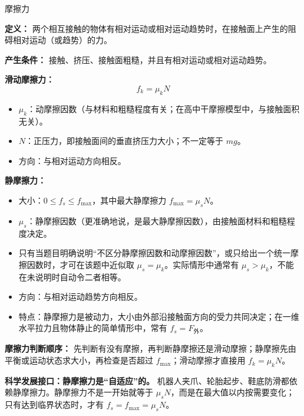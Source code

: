 \begin{conceptbox}{摩擦力}

\textbf{定义：} 两个相互接触的物体有相对运动或相对运动趋势时，在接触面上产生的阻碍相对运动（或趋势）的力。

\textbf{产生条件：} 接触、挤压、接触面粗糙，并且有相对运动或相对运动趋势。

\vspace{0.5em}
\textbf{滑动摩擦力：}
\[
f_k = \mu_k N
\]
\begin{itemize}
  \item $\mu_k$：动摩擦因数（与材料和粗糙程度有关；在高中干摩擦模型中，与接触面积无关）。
  \item $N$：正压力，即接触面间的垂直挤压力大小；不一定等于 $mg$。
  \item 方向：与相对运动方向相反。
\end{itemize}

\textbf{静摩擦力：}
\begin{itemize}
  \item 大小：$0 \leq f_s \leq f_{\max}$，其中最大静摩擦力 $f_{\max} = \mu_s N$。
  \item $\mu_s$：静摩擦因数（更准确地说，是最大静摩擦因数），由接触面材料和粗糙程度决定。
  \item 只有当题目明确说明“不区分静摩擦因数和动摩擦因数”，或只给出一个统一摩擦因数时，才可在该题中近似取 $\mu_s=\mu_k$。实际情形中通常有 $\mu_s>\mu_k$，不能在未说明时自动令二者相等。
  \item 方向：与相对运动趋势方向相反。
  \item 特点：静摩擦力是被动力，大小由外部沿接触面方向的受力共同决定；在一维水平拉力且物体静止的简单情形中，常有 $f_s = F_{\text{外}}$。
\end{itemize}

\textbf{摩擦力判断顺序：} 先判断有没有摩擦，再判断静摩擦还是滑动摩擦；静摩擦先由平衡或运动状态求大小，再检查是否超过 $f_{\max}$；滑动摩擦才直接用 $f_k=\mu_kN$。

\begin{center}


\label{fig:friction-compare}
\end{center}

\textbf{科学发展接口：静摩擦力是“自适应”的。} 机器人夹爪、轮胎起步、鞋底防滑都依赖静摩擦力。静摩擦力不是一开始就等于 $\mu_s N$，而是在最大值以内按需要变化；只有达到临界状态时，才有 $f_s=f_{\max}=\mu_s N$。

\begin{center}



\end{center}
\end{conceptbox}
